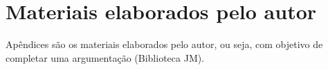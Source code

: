 \chapter{Materiais elaborados pelo autor}
\label{cap:apendice}

Apêndices são os materiais elaborados pelo autor, ou seja, com objetivo de completar uma argumentação (Biblioteca JM).
